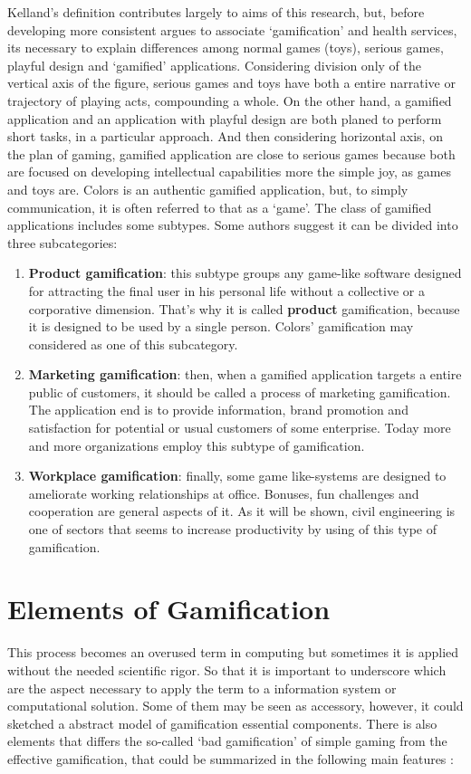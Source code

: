 Kelland's definition contributes largely to aims of this research, but, before developing more consistent argues to associate `gamification' and health services, its necessary to explain differences among normal games (toys), serious games, playful design and `gamified' applications. Considering division only of the vertical axis of the figure, serious games and toys have both a entire narrative or trajectory of playing acts, compounding a whole. On the other hand, a gamified application and an application with playful design are both planed to perform short tasks, in a particular approach. And then considering horizontal axis, on the plan of gaming, gamified application are close to serious games because both are focused on developing intellectual capabilities more the simple joy, as games and toys are.  Colors is an authentic gamified application, but, to simply communication, it is often referred to that as a `game'. The class of gamified applications includes some subtypes. Some authors suggest it can be divided into three subcategories:

\begin{enumerate}
	\item \textbf{Product gamification}: this subtype groups any game-like software designed for attracting the final user in his personal life without a collective or a corporative dimension. That's why it is called \textbf{product} gamification, because it is designed to be used by a single person. Colors' gamification may considered as one of this subcategory.
	\item \textbf{Marketing gamification}: then, when a gamified application targets a entire public of customers, it should be called a process of marketing gamification. The application end is to provide information, brand promotion and satisfaction for potential or usual customers of some enterprise. Today more and more organizations employ this subtype of gamification.
	\item \textbf{Workplace gamification}: finally, some game like-systems are designed to ameliorate working relationships at office. Bonuses, fun challenges and cooperation are general aspects of it. As it will be shown, civil engineering is one of sectors that seems to increase productivity by using of this type of gamification. 
\end{enumerate}

\section{Elements of Gamification}
This process becomes an overused term in computing but sometimes it is applied without the needed scientific rigor. So that it is important to underscore which are the aspect necessary to apply the term to a information system or computational solution. Some of them may be seen as accessory, however, it could sketched a abstract model of gamification essential components. There is also elements that differs the so-called `bad gamification' of simple gaming from the effective gamification, that could be summarized in the following main features \citep{conf/mue/Yamakami13a}:

